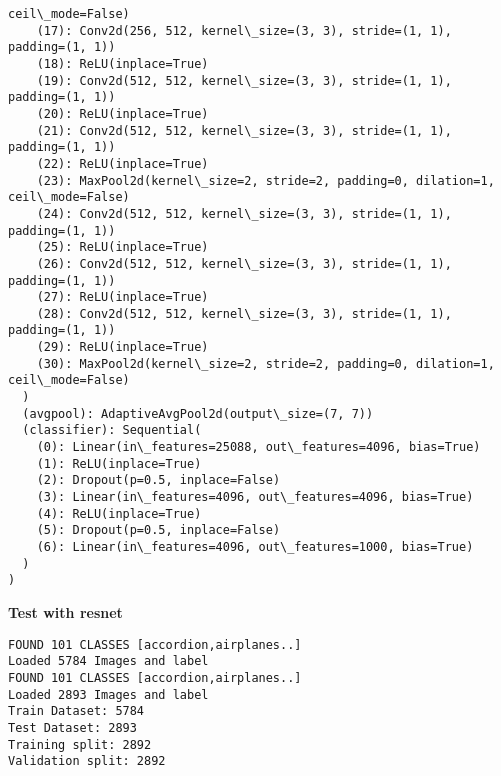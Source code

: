 \documentclass[11pt]{article}
\begin{document}
\begin{Verbatim}[commandchars=\\\{\}]
ceil\_mode=False)
    (17): Conv2d(256, 512, kernel\_size=(3, 3), stride=(1, 1), padding=(1, 1))
    (18): ReLU(inplace=True)
    (19): Conv2d(512, 512, kernel\_size=(3, 3), stride=(1, 1), padding=(1, 1))
    (20): ReLU(inplace=True)
    (21): Conv2d(512, 512, kernel\_size=(3, 3), stride=(1, 1), padding=(1, 1))
    (22): ReLU(inplace=True)
    (23): MaxPool2d(kernel\_size=2, stride=2, padding=0, dilation=1,
ceil\_mode=False)
    (24): Conv2d(512, 512, kernel\_size=(3, 3), stride=(1, 1), padding=(1, 1))
    (25): ReLU(inplace=True)
    (26): Conv2d(512, 512, kernel\_size=(3, 3), stride=(1, 1), padding=(1, 1))
    (27): ReLU(inplace=True)
    (28): Conv2d(512, 512, kernel\_size=(3, 3), stride=(1, 1), padding=(1, 1))
    (29): ReLU(inplace=True)
    (30): MaxPool2d(kernel\_size=2, stride=2, padding=0, dilation=1,
ceil\_mode=False)
  )
  (avgpool): AdaptiveAvgPool2d(output\_size=(7, 7))
  (classifier): Sequential(
    (0): Linear(in\_features=25088, out\_features=4096, bias=True)
    (1): ReLU(inplace=True)
    (2): Dropout(p=0.5, inplace=False)
    (3): Linear(in\_features=4096, out\_features=4096, bias=True)
    (4): ReLU(inplace=True)
    (5): Dropout(p=0.5, inplace=False)
    (6): Linear(in\_features=4096, out\_features=1000, bias=True)
  )
)
\end{Verbatim}

    \textbf{Test with resnet}

    \begin{Verbatim}[commandchars=\\\{\}]
FOUND 101 CLASSES [accordion,airplanes..]
Loaded 5784 Images and label
FOUND 101 CLASSES [accordion,airplanes..]
Loaded 2893 Images and label
Train Dataset: 5784
Test Dataset: 2893
Training split: 2892
Validation split: 2892
\end{Verbatim}
\end{document}
